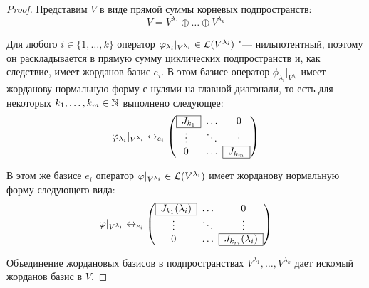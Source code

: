 \begin{proof}
	Представим $V$ в виде прямой суммы корневых подпространств:
	\[V = V^{\lambda_1} \oplus \dots \oplus V^{\lambda_k}\]

	Для любого $i \in \{1, \dotsc, k\}$ оператор $\varphi_{\lambda_i}|_{V^{\lambda_i}} \in \mathcal L({V^{\lambda_i}})$ "--- нильпотентный, поэтому он раскладывается в прямую сумму циклических подпространств и, как следствие, имеет жорданов базис $e_i$. В этом базисе оператор $\phi_{\lambda_i}|_{V^{\lambda_i}}$ имеет жорданову нормальную форму с нулями на главной диагонали, то есть для некоторых $k_1, \dotsc, k_m \in \mathbb{N}$ выполнено следующее:
	\[\phi_{\lambda_i}|_{V^{\lambda_i}} \leftrightarrow_{e_i} \left(\begin{array}{@{}ccc@{}}
		\cline{1-1}
		\multicolumn{1}{|c|}{J_{k_1}} & \dots & 0\\
		\cline{1-1}
		\vdots & \ddots & \vdots\\
		\cline{3-3}
		0 & \dots & \multicolumn{1}{|c|}{J_{k_m}}\\
		\cline{3-3}
	\end{array}\right)\]
	
	В этом же базисе $e_i$ оператор $\varphi|_{V^{\lambda_i}} \in \mathcal L({V^{\lambda_i}})$ имеет жорданову нормальную форму следующего вида:
	\[\phi|_{V^{\lambda_i}} \leftrightarrow_{e_i} \left(\begin{array}{@{}ccc@{}}
		\cline{1-1}
		\multicolumn{1}{|c|}{J_{k_1}(\lambda_i)} & \dots & 0\\
		\cline{1-1}
		\vdots & \ddots & \vdots\\
		\cline{3-3}
		0 & \dots & \multicolumn{1}{|c|}{J_{k_m}(\lambda_i)}\\
		\cline{3-3}
	\end{array}\right)\]
	
	Объединение жордановых базисов в подпространствах $V^{\lambda_1},\dotsc, V^{\lambda_k}$ дает искомый жорданов базис в $V$.
\end{proof}

